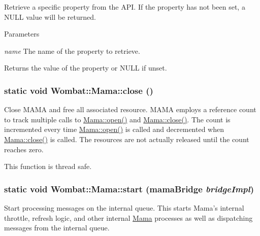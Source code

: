 Retrieve a specific property from the API. If the property has not been set, a NULL value will be returned.


\begin{DoxyParams}{Parameters}
\item[{\em name}]The name of the property to retrieve.\end{DoxyParams}
\begin{DoxyReturn}{Returns}
the value of the property or NULL if unset. 
\end{DoxyReturn}
\hypertarget{classWombat_1_1Mama_aa222cbf76174d7699e8174221832cff4}{
\subsubsection[{close}]{\setlength{\rightskip}{0pt plus 5cm}static void Wombat::Mama::close ()}}
\label{classWombat_1_1Mama_aa222cbf76174d7699e8174221832cff4}


Close MAMA and free all associated resource. MAMA employs a reference count to track multiple calls to \hyperlink{classWombat_1_1Mama_af1fafa88e6e22e7afc37b10de0f5a0d5}{Mama::open()} and \hyperlink{classWombat_1_1Mama_aa222cbf76174d7699e8174221832cff4}{Mama::close()}. The count is incremented every time \hyperlink{classWombat_1_1Mama_af1fafa88e6e22e7afc37b10de0f5a0d5}{Mama::open()} is called and decremented when \hyperlink{classWombat_1_1Mama_aa222cbf76174d7699e8174221832cff4}{Mama::close()} is called. The resources are not actually released until the count reaches zero.

This function is thread safe. \hypertarget{classWombat_1_1Mama_a826ec494ed4cd1f9b8ac1baa8ca5af30}{
\subsubsection[{start}]{\setlength{\rightskip}{0pt plus 5cm}static void Wombat::Mama::start (mamaBridge {\em bridgeImpl})}}
\label{classWombat_1_1Mama_a826ec494ed4cd1f9b8ac1baa8ca5af30}


Start processing messages on the internal queue. This starts Mama's internal throttle, refresh logic, and other internal \hyperlink{classWombat_1_1Mama}{Mama} processes as well as dispatching messages from the internal queue. 

